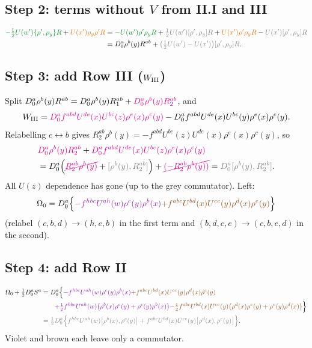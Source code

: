 \documentclass[10pt]{article}
\newcommand{\G}[1]{{\color{cG}#1}}
\newcommand{\Or}[1]{{\color{cO}#1}}
\newcommand{\Vi}[1]{{\color{cV}#1}}
\newcommand{\Br}[1]{{\color{cN}#1}}
\newcommand{\Ma}[1]{{\color{cM}#1}}
\newcommand{\Gr}[1]{{\color{cX}#1}}
\begin{document}
\subsection*{Step 2: terms without $V$ from II.I and III}
\begin{align}
\G{-\tfrac12U(w')\{\rho',\rho_{y}\}R}+\Or{U(x')\rho_{y}\rho'R}
&=\G{-U(w')\rho'\rho_{y}R}+\Gr{\tfrac12U(w')[\rho',\rho_{y}]R}+\Or{U(x')\rho'\rho_{y}R}-\Gr{U(x')[\rho',\rho_{y}]R}\notag\\
&=D_{0}^{a}\rho^{b}(y)R^{ab}+\Gr{\big(\tfrac12U(w')-U(x')\big)[\rho',\rho_{y}]R}.
\end{align}

\subsection*{Step 3: add Row III ($W_{\rm III}$)}
Split $D_{0}^{a}\rho^{b}(y)R^{ab}=D_{0}^{a}\rho^{b}(y)R_{1}^{ab}+\Ma{D_{0}^{a}\rho^{b}(y)R_{2}^{ab}}$, and\[W_{\rm III}=\Ma{D_{0}^{a}f^{abd}U^{de}(x)U^{bc}(z)\rho^{e}(x)\rho^{c}(y)}-D_{0}^{a}f^{abd}U^{de}(x)U^{bc}(y)\rho^{e}(x)\rho^{c}(y).\]Relabelling $c\leftrightarrow b$ gives $R_{2}^{ab}\rho^{b}(y)=-f^{abd}U^{bc}(z)U^{de}(x)\rho^{e}(x)\rho^{c}(y)$, so
\begin{align}
&\Ma{D_{0}^{a}\rho^{b}(y)R_{2}^{ab}}+\Ma{D_{0}^{a}f^{abd}U^{de}(x)U^{bc}(z)\rho^{e}(x)\rho^{c}(y)}\notag\\
&=D_{0}^{a}\Big(\Ma{\cancel{R_{2}^{ab}\rho^{b}(y)}}+\Gr{[\rho^{b}(y),R_{2}^{ab}]}\Big)+\Ma{\cancel{(-R_{2}^{ab}\rho^{b}(y))}}=\Gr{D_{0}^{a}[\rho^{b}(y),R_{2}^{ab}]}.
\end{align}
All $U(z)$ dependence has gone (up to the grey commutator). Left:
\begin{equation}
\Omega_{0}=D_{0}^{a}\Big\{\Vi{-f^{hbc}U^{ah}(w)\rho^{c}(y)\rho^{b}(x)}\Br{+f^{abc}U^{bd}(x)U^{ce}(y)\rho^{d}(x)\rho^{e}(y)}\Big\}
\end{equation}
(relabel $(c,b,d)\to(h,c,b)$ in the first term and $(b,d,c,e)\to(c,b,e,d)$ in the second).

\subsection*{Step 4: add Row II}
\begin{align}
\Omega_{0}+\tfrac12D_{0}^{a}S^{a}&=D_{0}^{a}\Big\{\Vi{-f^{hbc}U^{ah}(w)\rho^{c}(y)\rho^{b}(x)}\Br{+f^{abc}U^{bd}(x)U^{ce}(y)\rho^{d}(x)\rho^{e}(y)}\notag\\
&\qquad\Vi{+\tfrac12f^{hbc}U^{ah}(w)\big(\rho^{b}(x)\rho^{c}(y)+\rho^{c}(y)\rho^{b}(x)\big)}\Br{-\tfrac12f^{abc}U^{bd}(x)U^{ce}(y)\big(\rho^{d}(x)\rho^{e}(y)+\rho^{e}(y)\rho^{d}(x)\big)}\Big\}\notag\\
&=\Gr{\tfrac12D_{0}^{a}\Big\{f^{hbc}U^{ah}(w)\big[\rho^{b}(x),\rho^{c}(y)\big]+f^{abc}U^{bd}(x)U^{ce}(y)\big[\rho^{d}(x),\rho^{e}(y)\big]\Big\}}.
\end{align}
\Vi{Violet} and \Br{brown} each leave only a commutator.
\end{document}
